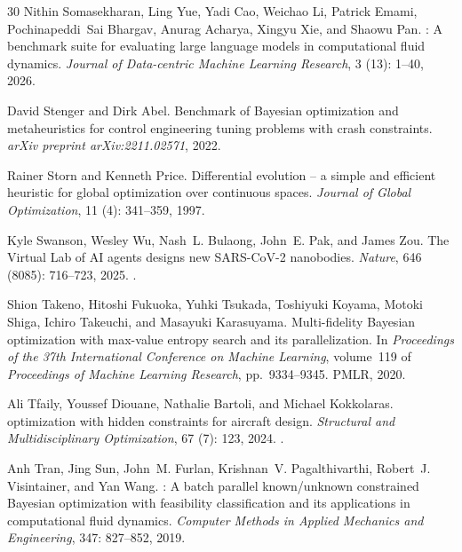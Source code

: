 \documentclass{article} %
\begin{document}
\begin{thebibliography}{30}
Nithin Somasekharan, Ling Yue, Yadi Cao, Weichao Li, Patrick Emami, Pochinapeddi~Sai Bhargav, Anurag Acharya, Xingyu Xie, and Shaowu Pan.
: A benchmark suite for evaluating large language models in computational fluid dynamics.
\newblock \emph{Journal of Data-centric Machine Learning Research}, 3 (13): 1--40, 2026.

David Stenger and Dirk Abel.
\newblock Benchmark of {Bayesian} optimization and metaheuristics for control engineering tuning problems with crash constraints.
\newblock \emph{arXiv preprint arXiv:2211.02571}, 2022.

Rainer Storn and Kenneth Price.
\newblock Differential evolution -- a simple and efficient heuristic for global optimization over continuous spaces.
\newblock \emph{Journal of Global Optimization}, 11 (4): 341--359, 1997.

Kyle Swanson, Wesley Wu, Nash~L. Bulaong, John~E. Pak, and James Zou.
\newblock The {Virtual Lab} of {AI} agents designs new {SARS-CoV-2} nanobodies.
\newblock \emph{Nature}, 646 (8085): 716--723, 2025.
\newblock {}.

Shion Takeno, Hitoshi Fukuoka, Yuhki Tsukada, Toshiyuki Koyama, Motoki Shiga, Ichiro Takeuchi, and Masayuki Karasuyama.
\newblock Multi-fidelity {Bayesian} optimization with max-value entropy search and its parallelization.
\newblock In \emph{Proceedings of the 37th International Conference on Machine Learning}, volume~119 of \emph{Proceedings of Machine Learning Research}, pp.\  9334--9345. PMLR, 2020.

Ali Tfaily, Youssef Diouane, Nathalie Bartoli, and Michael Kokkolaras.
 optimization with hidden constraints for aircraft design.
\newblock \emph{Structural and Multidisciplinary Optimization}, 67 (7): 123, 2024.
\newblock {}.

Anh Tran, Jing Sun, John~M. Furlan, Krishnan~V. Pagalthivarthi, Robert~J. Visintainer, and Yan Wang.
: A batch parallel known/unknown constrained {Bayesian} optimization with feasibility classification and its applications in computational fluid dynamics.
\newblock \emph{Computer Methods in Applied Mechanics and Engineering}, 347: 827--852, 2019.


\end{thebibliography}
\end{document}
